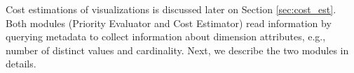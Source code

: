 Cost estimations of visualizations is discussed later on Section \ref{sec:cost_est}.
%
Both modules (Priority Evaluator and Cost Estimator) read information by querying metadata to collect information about dimension attributes, e.g., number of distinct values and cardinality.
%
Next, we describe the two modules in details.
%
%
%